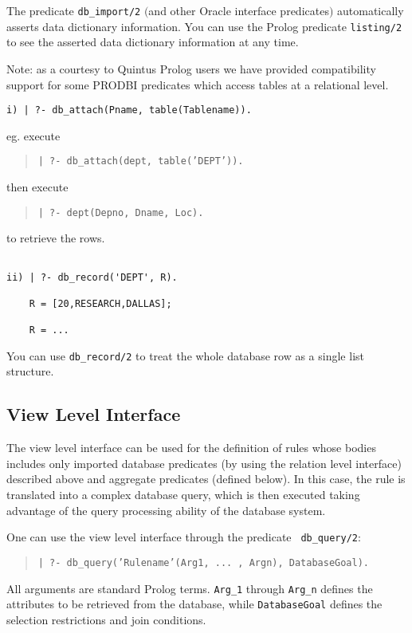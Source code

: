 The predicate {\tt db\_import/2} $($and other Oracle interface
predicates$)$ automatically asserts data dictionary information.  You
can use the Prolog predicate {\tt listing/2} to see the asserted data
dictionary information at any time.  


Note: as a courtesy to Quintus Prolog users we have provided
compatibility support for some PRODBI predicates which access tables
at a relational level.

\begin{verbatim}
i) | ?- db_attach(Pname, table(Tablename)).
\end{verbatim}

eg. execute 
\begin{quote}
{\tt | ?- db\_attach(dept, table('DEPT')).} 
\end{quote}
then execute 
\begin{quote}	
{\tt | ?- dept(Depno, Dname, Loc).}
\end{quote}
to retrieve the rows.
\begin{verbatim}

ii) | ?- db_record('DEPT', R).

    R = [20,RESEARCH,DALLAS];

    R = ...

\end{verbatim}
    You can use {\tt db\_record/2} to treat the whole database row as a single list structure.



\subsection{View Level Interface}



   The view level interface can be used for the definition of rules
whose bodies includes only imported database predicates (by using the
relation level interface) described above and aggregate predicates
(defined below).  In this case, the rule is translated into a complex
database query, which is then executed taking advantage of the query
processing ability of the database system.

One can use the view level interface through the predicate {\tt
db\_query/2}:  
\begin{quote}
{\tt | ?- db\_query('Rulename'(Arg1, ... , Argn), DatabaseGoal).}
\end{quote}
All arguments are standard Prolog terms.  {\tt Arg\_1} through {\tt Arg\_n}
defines the attributes to be retrieved from the database, while
{\tt DatabaseGoal} defines the selection restrictions and join conditions.

